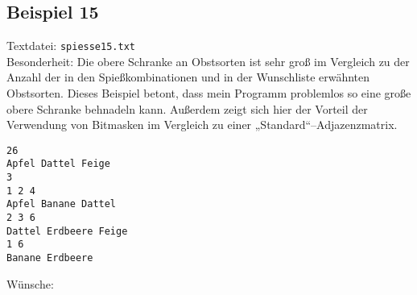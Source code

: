 \subsection{Beispiel 15}\label{example:15}
Textdatei: \texttt{spiesse15.txt}\\
Besonderheit: Die obere Schranke an Obstsorten ist sehr groß im Vergleich zu der Anzahl der 
in den Spießkombinationen und in der Wunschliste erwähnten Obstsorten. Dieses Beispiel betont, dass
mein Programm problemlos so eine große obere Schranke behnadeln kann. Außerdem zeigt sich hier der
Vorteil der Verwendung von Bitmasken im Vergleich zu einer „Standard“--Adjazenzmatrix.
\begin{verbatim}
26
Apfel Dattel Feige
3
1 2 4
Apfel Banane Dattel
2 3 6
Dattel Erdbeere Feige
1 6
Banane Erdbeere
\end{verbatim}

\noindent
Wünsche: \\

\noindent
{}